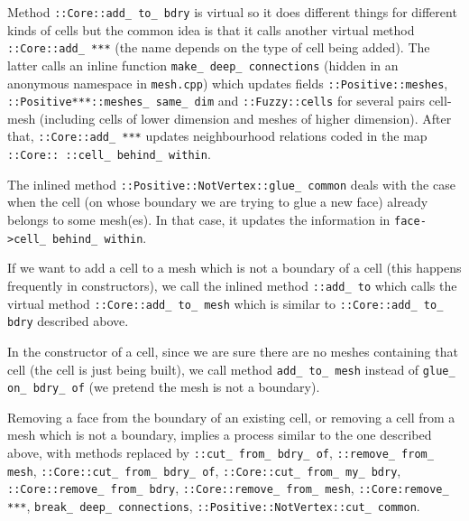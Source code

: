 Method {\small\tt {}::Core::add\_\,to\_\,bdry} is virtual so it does different things for
different kinds of cells but the common idea is that it calls another virtual method
{\small\tt {}::Core::add\_\,***} (the name depends on the type of cell being added).
The latter calls an inline function {\small\tt make\_\,deep\_\,connections} (hidden in an anonymous
namespace in {\small\tt mesh.cpp}) which updates fields
{\small\tt {}::Positive::meshes}, {\small\tt {}::Positive***::meshes\_\,same\_\,dim} and
{\small\tt {}::Fuzzy::cells} for several pairs cell-mesh
(including cells of lower dimension and meshes of higher dimension).
After that, {\small\tt {}::Core::add\_\,***} updates neighbourhood relations
coded in the map {\small\tt {}::Core:: ::cell\_\,behind\_\,within}.

The inlined method {\small\tt {}::Positive::NotVertex::glue\_\,common} deals with
the case when the cell (on whose boundary we are trying to glue a new face)
already belongs to some mesh(es).
In that case, it updates the information in {\small\tt face->cell\_\,behind\_\,within}.

If we want to add a cell to a mesh which is not a boundary of a cell (this happens
frequently in {\small\tt {}} constructors),
we call the inlined method {\small\tt {}::add\_\,to} which calls the virtual method
{\small\tt {}::Core::add\_\,to\_\,mesh} which is similar to {\small\tt {}::Core::add\_\,to\_\,bdry}
described above.

In the constructor of a cell, since we are sure there are no meshes containing that cell
(the cell is just being built),
we call method {\small\tt add\_\,to\_\,mesh} instead of {\small\tt glue\_\,on\_\,bdry\_\,of}
(we pretend the mesh is not a boundary).

Removing a face from the boundary of an existing cell, or removing a cell from a mesh
which is not a boundary, implies a process similar to the one described above,
with methods replaced by {\small\tt {}::cut\_\,from\_\,bdry\_\,of},
{\small\tt {}::remove\_\,from\_\,mesh},
{\small\tt {}::Core::cut\_\,from\_\,bdry\_\,of},
{\small\tt {}::Core::cut\_\,from\_\,my\_\,bdry},
{\small\tt {}::Core::remove\_\,from\_\,bdry}, {\small\tt {}::Core::remove\_\,from\_\,mesh},
{\small\tt {}::Core:remove\_\,***}, {\small\tt break\_\,deep\_\,connections},
{\small\tt {}::Positive::NotVertex::cut\_\,common}.


